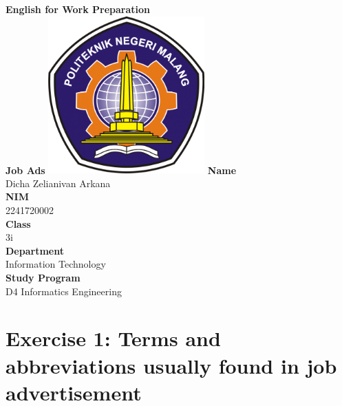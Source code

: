 \documentclass[12pt,titlepage]{article}
\newcommand{\vSubject}{English for Work Preparation}
\newcommand{\vSubtitle}{Job Ads}
\newcommand{\vName}{Dicha Zelianivan Arkana}
\newcommand{\vNIM}{2241720002}
\newcommand{\vClass}{3i}
\newcommand{\vDepartment}{Information Technology}
\newcommand{\vStudyProgram}{D4 Informatics Engineering}
\begin{document}
\begin{titlepage}
    \centering
    \vfill
    {\bfseries\LARGE
        \vSubject\\
        \vskip0.25cm
        \vSubtitle
    }
    \vfill
    \includegraphics[width=6cm]{images/polinema-logo.png}
    \vfill
    {
        \textbf{Name}\\
        \vName\\
        \vskip0.5cm
        \textbf{NIM}\\
        \vNIM\\
        \vskip0.5cm
        \textbf{Class}\\
        \vClass\\
        \vskip0.5cm
        \textbf{Department}\\
        \vDepartment\\
        \vskip0.5cm
        \textbf{Study Program}\\
        \vStudyProgram
    }
\end{titlepage}

\tableofcontents

\pagebreak

\section{Exercise 1: Terms and abbreviations usually found in job advertisement}
\end{document}
